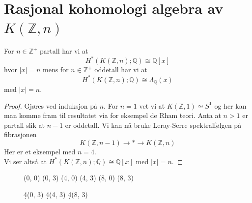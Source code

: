 \documentclass[UKenglish]{beamer}
\begin{document}
\section{Rasjonal kohomologi algebra av \( K(\mathbb{Z}, n) \)}
\SectionPage


\begin{frame}[allowframebreaks]
    \begin{theorem}[]
       For \( n\in \mathbb{Z}^+ \) partall har vi at
       \begin{equation}
           H^*(K(\mathbb{Z}, n);\mathbb{Q})\cong \mathbb{Q}[x]
       \end{equation}
        hvor \( |x|=n \) mens for \( n \in \mathbb{Z}^+ \) oddetall har
        vi at
        \begin{equation}
            H^*(K(\mathbb{Z}, n);\mathbb{Q})\cong \Lambda_\mathbb{Q}(x)
        \end{equation}
        med \( |x|=n \).
    \end{theorem}    
    \begin{proof}
        Gjøres ved induksjon på \( n \). For \( n=1 \) vet vi at
        \( K(\mathbb{Z}, 1)\simeq S^1 \) og her kan man komme fram til
        resultatet via for eksempel de Rham teori. Anta at \( n> 1 \) er
        partall slik at \( n-1 \) er oddetall. Vi kan nå bruke
        Leray-Serre spektralfølgen på fibrasjonen
        \begin{equation}
            K(\mathbb{Z}, n-1)\rightarrow *\rightarrow K(\mathbb{Z}, n)
        \end{equation}
        Her er et eksempel med \( n=4 \). \\
       
        Vi ser altså at \( H^*(K(\mathbb{Z}, n); \mathbb{Q})\cong \mathbb{Q}[x] \)
        med \( |x|=n \).
    \end{proof}
\end{frame}

\begin{frame}[c]
       \begin{figure}
           \centering
        \begin{sseqpage}[classes = {draw = none}, cohomological Serre grading]
          \class["\mathbb{Q}"](0, 0)
          \class["\mathbb{Q}_y"](0, 3)
          \class["\mathbb{Q}_x"](4, 0)
          \class["\mathbb{Q}_{xy}"](4, 3)
          \class["\mathbb{Q}_{x^2}"](8, 0)
          \class["\mathbb{Q}_{x^2 y}"](8, 3)

          \d4(0, 3) 
          \d4(4, 3)
          \d4(8, 3)
        \end{sseqpage}
       \end{figure} 
\end{frame}
\end{document}
